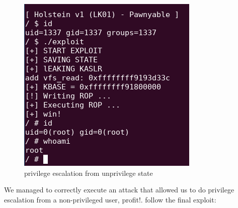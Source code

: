     
    \begin{figure}[htbp]
        \centering
        \includegraphics[width=0.5\linewidth]{Images/LPE_kernel_exploit.png}
        \caption{privilege escalation from unprivilege state}
        \label{fig:enter-label}
    \end{figure}
    We managed to correctly execute an attack that allowed us to do privilege escalation from a non-privileged user, profit!.\newline
    follow the final exploit: \newline
    
    
    
    
    